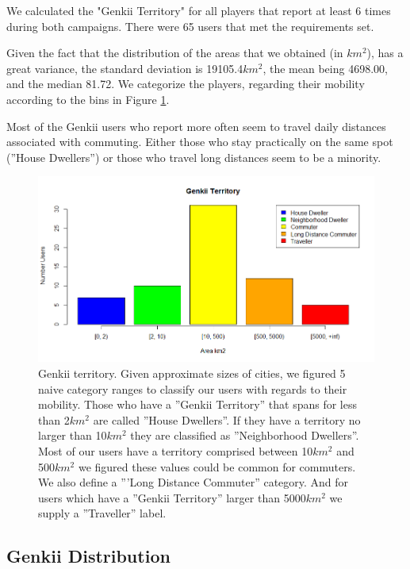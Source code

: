 \documentclass[letterpaper]{article}
\begin{document}
We calculated the "Genkii Territory" for all players that report at least 6 times during both campaigns. There were 65 users that met the requirements set.

Given the fact that the distribution of the areas that we obtained (in $km^2$),
has a great variance, the standard deviation is 19105.4$km^2$, the mean being 4698.00, and the median 81.72. We categorize the players, regarding their mobility according to the bins in Figure \ref{fig:territory}.

Most of the Genkii users who report more often seem to travel daily distances associated with commuting. Either those who stay practically on  the same spot (''House Dwellers'') or those who travel long distances seem to be a minority.

\begin{figure}[htb]
	\begin{center}
		\includegraphics[width=1\linewidth]{images/territory}
		\caption{Genkii territory. Given approximate sizes of cities, we figured 5 naive category ranges to classify our users with regards to their mobility. Those who have a ''Genkii Territory'' that spans for less than 2$km^2$ are called ''House Dwellers''. If they have a territory no larger than 10$km^2$ they are classified as ''Neighborhood Dwellers''. Most of our users have a territory comprised between 10$km^2$ and 500$km^2$ we figured these values could be common for commuters.
			We also define a '''Long Distance Commuter'' category. And for  users which have a ''Genkii Territory'' larger than 5000$km^2$ we supply a ''Traveller'' label. \label{fig:territory}}
	\end{center}
\end{figure}




\subsection{Genkii Distribution}
\end{document}
